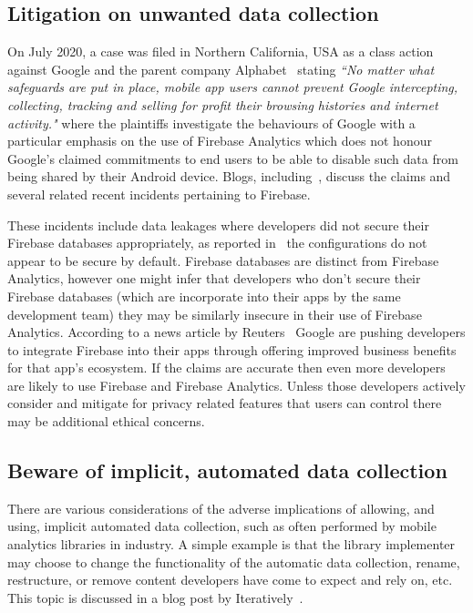 \subsection{Litigation on unwanted data collection}
On  July 2020, a case was filed in Northern California, USA as a class action against Google and the parent company Alphabet~\cite{rodriguez_et_al_v_google_llc_et_al_2020} stating \emph{``No matter what safeguards are put in place, mobile app users cannot prevent Google intercepting, collecting, tracking and selling for profit their browsing histories and internet activity."} where the plaintiffs investigate the behaviours of Google with a particular emphasis on the use of Firebase Analytics which does not honour Google's claimed commitments to end users to be able to disable such data from being shared by their Android device. Blogs, including~\cite{winder2020_forbes_on_the_class_action_firebase_analytics}, discuss the claims and several related recent incidents pertaining to Firebase.

These incidents include data leakages where developers did not secure their Firebase databases appropriately, as reported in~\cite{bischoff2020_firebase_missconfiguration} the configurations do not appear to be secure by default. Firebase databases are distinct from Firebase Analytics, however one might infer that developers who don't secure their Firebase databases (which are incorporate into their apps by the same development team) they may be similarly insecure in their use of Firebase Analytics. According to a news article by Reuters~\cite{dave2020_reuters_firebase_squeeze} Google are pushing developers to integrate Firebase into their apps through offering improved business benefits for that app's ecosystem. If the claims are accurate then even more developers are likely to use Firebase and Firebase Analytics. Unless those developers actively consider and mitigate for privacy related features that users can control there may be additional ethical concerns.

% 

\subsection{Beware of implicit, automated data collection}
There are various considerations of the adverse implications of allowing, and using, implicit automated data collection, such as often performed by mobile analytics libraries in industry. A simple example is that the library implementer may choose to change the functionality of the automatic data collection, rename, restructure, or remove content developers have come to expect and rely on, etc. This topic is discussed in a blog post by Iteratively~\cite{mukherjee_implicit_versus_explicit_event_tracking_hits_and_misses}.

